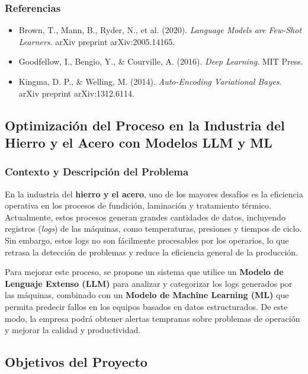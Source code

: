 \subsubsection{Referencias}
\begin{itemize}
    \item Brown, T., Mann, B., Ryder, N., et al. (2020). \textit{Language Models are Few-Shot Learners}. arXiv preprint arXiv:2005.14165.
    \item Goodfellow, I., Bengio, Y., & Courville, A. (2016). \textit{Deep Learning}. MIT Press.
    \item Kingma, D. P., & Welling, M. (2014). \textit{Auto-Encoding Variational Bayes}. arXiv preprint arXiv:1312.6114.
\end{itemize}

\subsection{Optimización del Proceso en la Industria del Hierro y el Acero con Modelos LLM y ML}

\subsubsection{Contexto y Descripción del Problema}

En la industria del \textbf{hierro y el acero}, uno de los mayores desafíos es la eficiencia operativa en los procesos de fundición, laminación y tratamiento térmico. Actualmente, estos procesos generan grandes cantidades de datos, incluyendo registros (\textit{logs}) de las máquinas, como temperaturas, presiones y tiempos de ciclo. Sin embargo, estos logs no son fácilmente procesables por los operarios, lo que retrasa la detección de problemas y reduce la eficiencia general de la producción.

Para mejorar este proceso, se propone un sistema que utilice un \textbf{Modelo de Lenguaje Extenso (LLM)} para analizar y categorizar los logs generados por las máquinas, combinado con un \textbf{Modelo de Machine Learning (ML)} que permita predecir fallos en los equipos basados en datos estructurados. De este modo, la empresa podrá obtener alertas tempranas sobre problemas de operación y mejorar la calidad y productividad.

\subsection{Objetivos del Proyecto}

